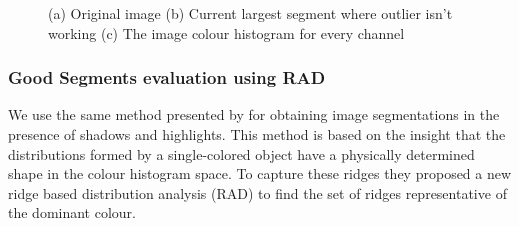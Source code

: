 \documentclass[twoside,11pt]{article}
\begin{document}
\begin{figure}[!t]
\centering
{}
\caption{(a) Original image (b) Current largest segment where outlier isn't working
(c) The image colour histogram for every channel }
\label{fig:outlier_not}
\end{figure}

\subsubsection{Good Segments evaluation using RAD}

We use the same method presented by \cite{1478239} for obtaining image
segmentations in the presence of shadows and highlights. This method is based on
the insight that the distributions formed by a single-colored object have a
physically determined shape in the colour histogram space. To capture
these ridges they proposed a new ridge based distribution analysis (RAD) to find
the set of ridges representative of the dominant colour.
\end{document}
